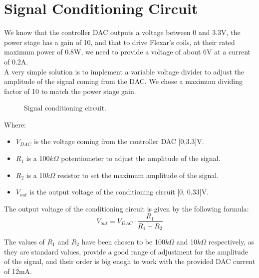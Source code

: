 \section{Signal Conditioning Circuit}
\label{Signal_Conditioning_Circuit}
We know that the controller DAC outputs a voltage between 0 and 3.3V, the power stage has a gain of 10, and that to drive Flexar's coils, at their rated maximum power of 0.8W, we need to provide a voltage of about 6V at a current of 0.2A. \\
A very simple solution is to implement a variable voltage divider to adjust the amplitude of the signal coming from the DAC.
We chose a maximum dividing factor of 10 to match the power stage gain.

\begin{figure}[!ht]
    \centering
    \resizebox{.7\linewidth}{!}{}
    \caption{Signal conditioning circuit.}
    \label{fig:cond_circuit}
\end{figure}

Where: 
\begin{itemize}
    \item $V_{DAC}$ is the voltage coming from the controller DAC [0,3.3]V.
    \item $R_1$ is a 100$k\Omega$ potentiometer to adjust the amplitude of the signal.
    \item $R_2$ is a 10$k\Omega$ resistor to set the maximum amplitude of the signal.
    \item $V_{out}$ is the output voltage of the conditioning circuit [0, 0.33]V.
\end{itemize}

The output voltage of the conditioning circuit is given by the following formula:
\begin{equation}
    V_{out} = V_{DAC} \cdot \frac{R_1}{R_1 + R_2}
\end{equation}

The values of $R_1$ and $R_2$ have been chosen to be 100$k\Omega$ and 10$k\Omega$ respectively, as they are standard values, provide a good range of adjustment for the amplitude of the signal, and their order is big enogh to work with the provided DAC current of 12mA.